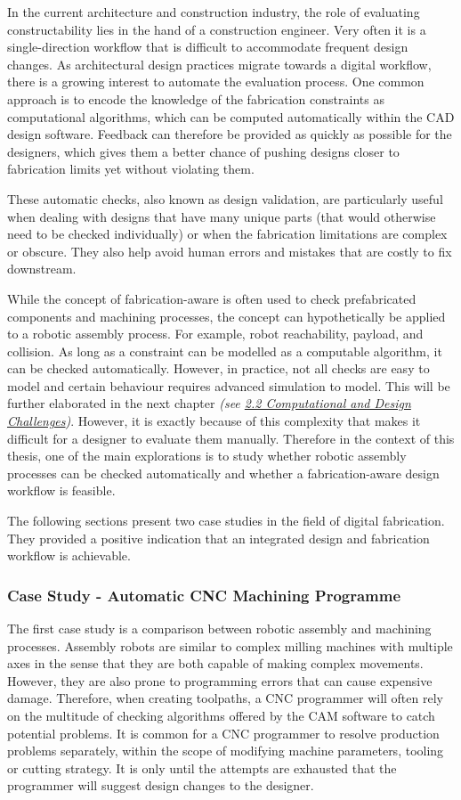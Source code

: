 \documentclass[11pt]{book}
\begin{document}
In the current architecture and construction industry, the role of evaluating constructability lies in the hand of a construction engineer. Very often it is a single-direction workflow that is difficult to accommodate frequent design changes. As architectural design practices migrate towards a digital workflow, there is a growing interest to automate the evaluation process. One common approach is to encode the knowledge of the fabrication constraints as computational algorithms, which can be computed automatically within the CAD design software. Feedback can therefore be provided as quickly as possible for the designers, which gives them a better chance of pushing designs closer to fabrication limits yet without violating them. 

These automatic checks, also known as design validation, are particularly useful when dealing with designs that have many unique parts (that would otherwise need to be checked individually) or when the fabrication limitations are complex or obscure. They also help avoid human errors and mistakes that are costly to fix downstream. 

While the concept of fabrication-aware is often used to check prefabricated components and machining processes, the concept can hypothetically be applied to a robotic assembly process. For example, robot reachability, payload, and collision. As long as a constraint can be modelled as a computable algorithm, it can be checked automatically. However, in practice, not all checks are easy to model and certain behaviour requires advanced simulation to model. This will be further elaborated in the next chapter \textit{(see \underline{2.2 Computational and Design Challenges})}. However, it is exactly because of this complexity that makes it difficult for a designer to evaluate them manually. Therefore in the context of this thesis, one of the main explorations is to study whether robotic assembly processes can be checked automatically and whether a fabrication-aware design workflow is feasible. 

The following sections present two case studies in the field of digital fabrication. They provided a positive indication that an integrated design and fabrication workflow is achievable.

\subsubsection{Case Study - Automatic CNC Machining Programme}

The first case study is a comparison between robotic assembly and machining processes. Assembly robots are similar to complex milling machines with multiple axes in the sense that they are both capable of making complex movements. However, they are also prone to programming errors that can cause expensive damage. Therefore, when creating toolpaths, a CNC programmer will often rely on the multitude of checking algorithms offered by the CAM software to catch potential problems. It is common for a CNC programmer to resolve production problems separately, within the scope of modifying machine parameters, tooling or cutting strategy. It is only until the attempts are exhausted that the programmer will suggest design changes to the designer. 
\end{document}
